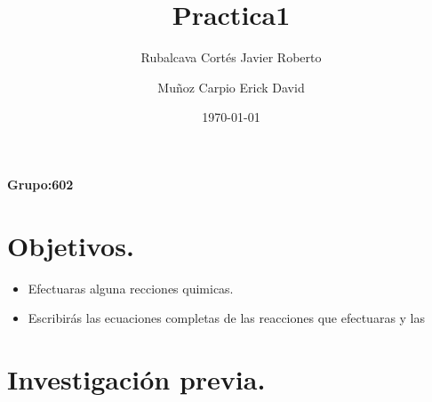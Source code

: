 \documentclass[letter]{article}
\title{Practica1}
\author{
Rubalcava Cortés Javier Roberto
\and 
Muñoz Carpio Erick David
}
\date{\today}
\begin{document}
\maketitle
\begin{center}
	\textbf{Grupo:602}
\end{center}

\newpage

 
\tableofcontents{}
\newpage



\section{Objetivos.}

\begin{itemize}
	\item Efectuaras alguna recciones quimicas.
	\item Escribirás las ecuaciones completas de las reacciones que efectuaras y las
\end{itemize}

\section{Investigación previa.}
\end{document}

